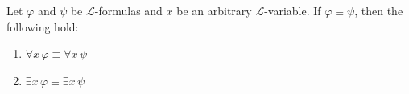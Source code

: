\begin{thm}
     \label{logical-equivalence:replacing-logically-equivalent-formulas-in-quantified-formulas-yields-logically-equivalent-formulas}
    Let \( \varphi \) and \( \psi \) be \( \mathcal{L} \)-formulas and \( x \) be an arbitrary \( \mathcal{L} \)-variable.
    If \( \varphi \equiv \psi \), then the following hold:
    \begin{enumerate}[topsep=2pt,label=\textup{\texttt{(\alph*)}}]
        \item \( \forall x \, \varphi \equiv \forall x \, \psi \)   \label{enum:equivalent-universal-formulas}
        \item \( \exists x \, \varphi \equiv \exists x \, \psi \)  \label{enum:equivalent-existential-formulas}
    \end{enumerate}
\end{thm}

